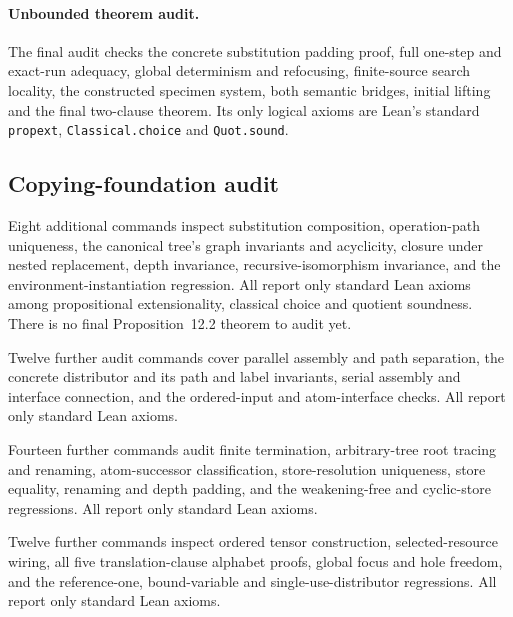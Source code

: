 \paragraph{Unbounded theorem audit.}
The final audit checks the concrete substitution padding proof, full one-step
and exact-run adequacy, global determinism and refocusing, finite-source
search locality, the constructed specimen system, both semantic bridges,
initial lifting and the final two-clause theorem. Its only logical axioms are
Lean's standard \texttt{propext}, \texttt{Classical.choice} and \texttt{Quot.sound}.

\subsection{Copying-foundation audit}
Eight additional commands inspect substitution composition, operation-path
uniqueness, the canonical tree's graph invariants and acyclicity, closure under
nested replacement, depth invariance, recursive-isomorphism invariance, and
the environment-instantiation regression. All report only standard Lean axioms
among propositional extensionality, classical choice and quotient soundness.
There is no final Proposition~12.2 theorem to audit yet.


Twelve further audit commands cover parallel assembly and path separation,
the concrete distributor and its path and label invariants, serial assembly
and interface connection, and the ordered-input and atom-interface checks.
All report only standard Lean axioms.


Fourteen further commands audit finite termination, arbitrary-tree root
tracing and renaming, atom-successor classification, store-resolution
uniqueness, store equality, renaming and depth padding, and the weakening-free
and cyclic-store regressions. All report only standard Lean axioms.


Twelve further commands inspect ordered tensor construction, selected-resource
wiring, all five translation-clause alphabet proofs, global focus and hole
freedom, and the reference-one, bound-variable and single-use-distributor
regressions. All report only standard Lean axioms.


